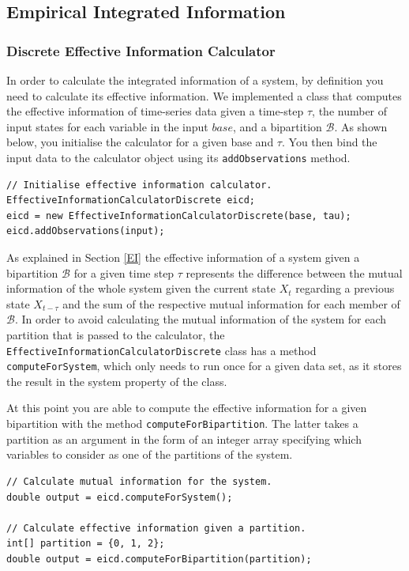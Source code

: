 \documentclass[a4paper,11pt]{article}
\begin{document}
\subsection{Empirical Integrated Information}
\label{sec:impl:phi-e}

\subsubsection{Discrete Effective Information Calculator}
\label{sec:impl:ei}

In order to calculate the integrated information of a system, by definition you need to calculate its effective information. We implemented a class that computes the effective information of time-series data given a time-step $\tau$, the number of input states for each variable in the input $base$, and a bipartition $\mathcal{B}$. As shown below, you initialise the calculator for a given base and $\tau$. You then bind the input data to the calculator object using its \texttt{addObservations} method.

\begin{verbatim}
// Initialise effective information calculator.
EffectiveInformationCalculatorDiscrete eicd;
eicd = new EffectiveInformationCalculatorDiscrete(base, tau);
eicd.addObservations(input);
\end{verbatim}

As explained in Section \ref{EI} the effective information of a system given a bipartition $\mathcal{B}$ for a given time step $\tau$ represents the difference between the mutual information of the whole system given the current state $X_t$ regarding a previous state $X_{t-\tau}$ and the sum of the respective mutual information for each member of $\mathcal{B}$. In order to avoid calculating the mutual information of the system for each partition that is passed to the calculator, the \texttt{EffectiveInformationCalculatorDiscrete} class has a method \texttt{computeForSystem}, which only needs to run once for a given data set, as it stores the result in the system property of the class.

At this point you are able to compute the effective information for a given bipartition with the method \texttt{computeForBipartition}. The latter takes a partition as an argument in the form of an integer array specifying which variables to consider as one of the partitions of the system.

\begin{verbatim}
// Calculate mutual information for the system.
double output = eicd.computeForSystem();

// Calculate effective information given a partition.
int[] partition = {0, 1, 2};
double output = eicd.computeForBipartition(partition);
\end{verbatim}
\end{document}
